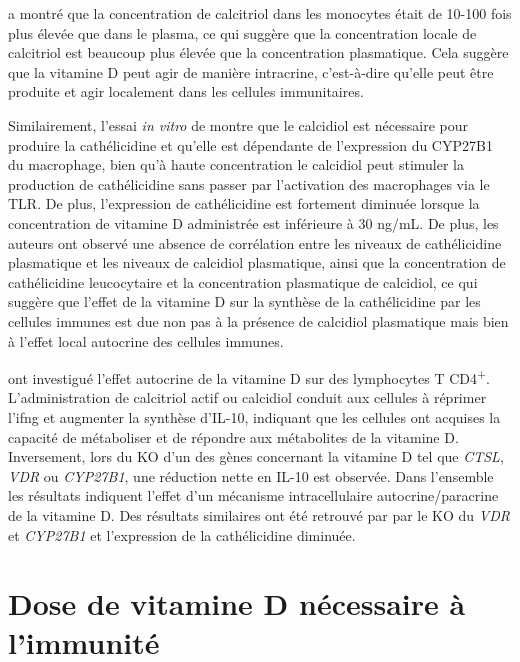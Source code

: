 \documentclass[
  a4paper,
  DIV=11,
  numbers=noendperiod,
  listof=totoc]{scrreprt}
\begin{document}
\textcite{Chun.2010} a montré que la concentration de calcitriol dans
les monocytes était de 10-100 fois plus élevée que dans le plasma, ce
qui suggère que la concentration locale de calcitriol est beaucoup plus
élevée que la concentration plasmatique. Cela suggère que la vitamine D
peut agir de manière intracrine, c'est-à-dire qu'elle peut être produite
et agir localement dans les cellules immunitaires.

Similairement, l'essai \emph{in vitro} de \textcite{Adams.2009} montre
que le calcidiol est nécessaire pour produire la cathélicidine et
qu'elle est dépendante de l'expression du CYP27B1 du macrophage, bien
qu'à haute concentration le calcidiol peut stimuler la production de
cathélicidine sans passer par l'activation des macrophages via le TLR.
De plus, l'expression de cathélicidine est fortement diminuée lorsque la
concentration de vitamine D administrée est inférieure à 30 ng/mL. De
plus, les auteurs ont observé une absence de corrélation entre les
niveaux de cathélicidine plasmatique et les niveaux de calcidiol
plasmatique, ainsi que la concentration de cathélicidine leucocytaire et
la concentration plasmatique de calcidiol, ce qui suggère que l'effet de
la vitamine D sur la synthèse de la cathélicidine par les cellules
immunes est due non pas à la présence de calcidiol plasmatique mais bien
à l'effet local autocrine des cellules immunes.

\textcite{Chauss.2022} ont investigué l'effet autocrine de la vitamine D
sur des lymphocytes T CD4\textsuperscript{+}. L'administration de
calcitriol actif ou calcidiol conduit aux cellules à réprimer
l'\ac{ifng} et augmenter la synthèse d'IL-10, indiquant que les cellules
ont acquises la capacité de métaboliser et de répondre aux métabolites
de la vitamine D. Inversement, lors du KO d'un des gènes concernant la
vitamine D tel que \emph{CTSL}, \emph{VDR} ou \emph{CYP27B1}, une
réduction nette en IL-10 est observée. Dans l'ensemble les résultats
indiquent l'effet d'un mécanisme intracellulaire autocrine/paracrine de
la vitamine D. Des résultats similaires ont été retrouvé par
\textcite{Adams.2009} par le KO du \emph{VDR} et \emph{CYP27B1} et
l'expression de la cathélicidine diminuée.

\section{Dose de vitamine D nécessaire à
l'immunité}\label{dose-de-vitamine-d-nuxe9cessaire-uxe0-limmunituxe9}

\newpage{}
\end{document}
